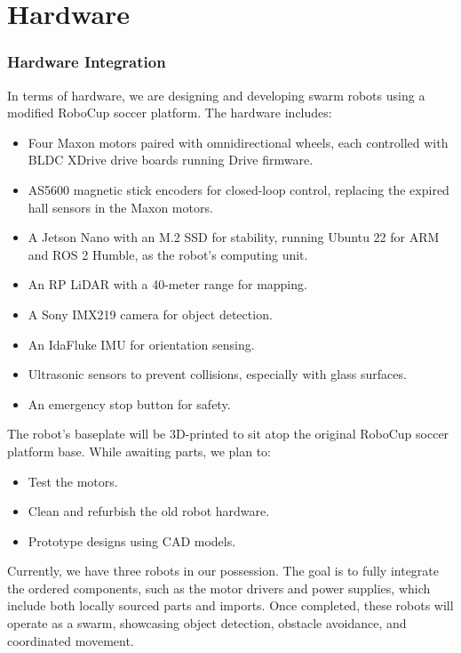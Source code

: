\chapter{Hardware}

\subsection*{Hardware Integration}
In terms of hardware, we are designing and developing swarm robots using a modified RoboCup soccer platform. The hardware includes:
\begin{itemize}
    \item Four Maxon motors paired with omnidirectional wheels, each controlled with BLDC XDrive drive boards running Drive firmware.
    \item AS5600 magnetic stick encoders for closed-loop control, replacing the expired hall sensors in the Maxon motors.
    \item A Jetson Nano with an M.2 SSD for stability, running Ubuntu 22 for ARM and ROS 2 Humble, as the robot’s computing unit.
    \item An RP LiDAR with a 40-meter range for mapping.
    \item A Sony IMX219 camera for object detection.
    \item An IdaFluke IMU for orientation sensing.
    \item Ultrasonic sensors to prevent collisions, especially with glass surfaces.
    \item An emergency stop button for safety.
\end{itemize}

The robot’s baseplate will be 3D-printed to sit atop the original RoboCup soccer platform base. While awaiting parts, we plan to:
\begin{itemize}
    \item Test the motors.
    \item Clean and refurbish the old robot hardware.
    \item Prototype designs using CAD models.
\end{itemize}

Currently, we have three robots in our possession. The goal is to fully integrate the ordered components, such as the motor drivers and power supplies, which include both locally sourced parts and imports. Once completed, these robots will operate as a swarm, showcasing object detection, obstacle avoidance, and coordinated movement.
